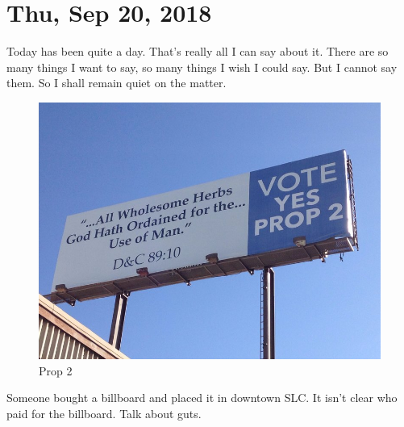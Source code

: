 \section{Thu, Sep 20, 2018}

Today has been quite a day. That's really all I can say about it. There are so many
things I want to say, so many things I wish I could say. But I cannot say them. So I
shall remain quiet on the matter.

\begin{figure}[h!]
  \centering
  \includegraphics[width=.5\linewidth]{2018/images/prop2.jpg}
  \caption{Prop 2}
  \label{fig:prop2}
\end{figure}

Someone bought a billboard and placed it in downtown SLC. It isn't clear who paid for
the billboard. Talk about guts.